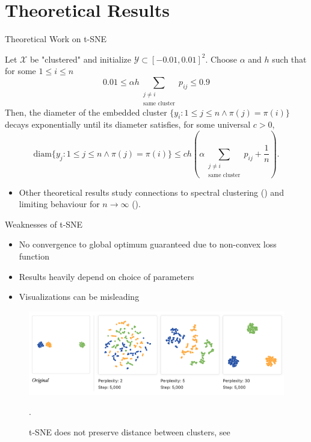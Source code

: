 \section{Theoretical Results}

\begin{frame}{Theoretical Work on t-SNE}
    \begin{theorem}
        Let $\mathcal{X}$ be "clustered" and initialize $\mathcal{Y} \subset [-0.01, 0.01]^2$. Choose $\alpha$ and $h$ such that for some $1 \leq i \leq n$ \[0.01 \leq \alpha h \sum_{\substack{j \neq i \\ \text{same cluster}}} p_{ij} \leq 0.9\] Then, the diameter of the embedded cluster $\{y_i: 1 \leq j \leq n \land \pi(j) = \pi(i)\}$ decays exponentially until its diameter satisfies, for some universal $c > 0$, 
        \[ \text{diam}\{y_j: 1 \leq j \leq n \land \pi(j) = \pi(i) \} \leq c h \left( \alpha  \sum_{\substack{j \neq i \\ \text{same cluster}}} p_{ij} + \frac{1}{n}\right). \]
    \end{theorem}\pause
    \begin{itemize}
        \item Other theoretical results study connections to spectral clustering (\cite{CaiMa2022}) and limiting behaviour for $n \to \infty$ (\cite{murray2024largedatalimitsscaling}). 
    \end{itemize}
\end{frame}

\begin{frame}{Weaknesses of t-SNE}
    \begin{itemize}
        \item No convergence to global optimum guaranteed due to non-convex loss function \pause
        \item Results heavily depend on choice of parameters \pause 
        \item Visualizations can be misleading  
    \end{itemize}
    \begin{figure}
        \centering
        \includegraphics[width=\textwidth]{misread_tsne_1.png}
        \caption{t-SNE does not preserve distance between clusters, see \cite{wattenberg2016how}}. 
    \end{figure}
\end{frame}
 


